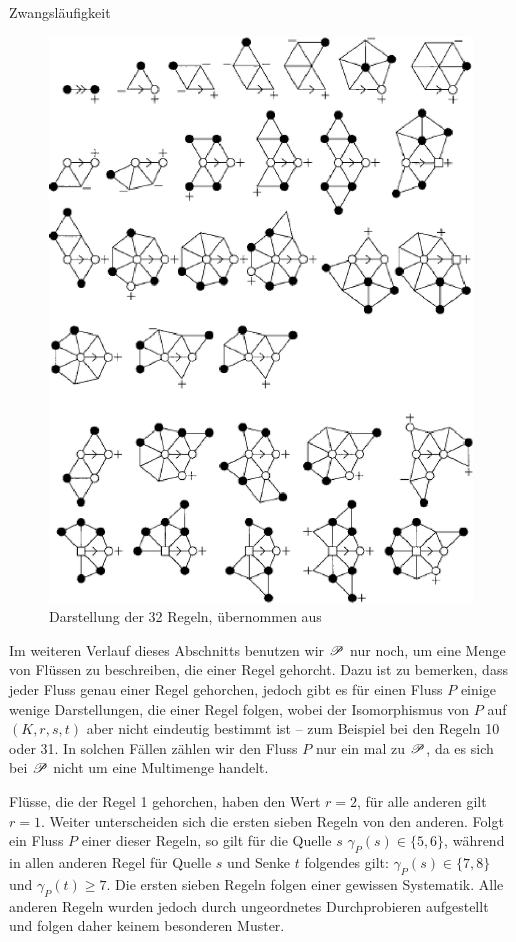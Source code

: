 \begin{section}{Zwangsläufigkeit}
 \begin{figure}[ht]
  \label{fig4}
  \centering
  \includegraphics{seymour/regeln.eps}%
  \caption[Darstellung der 32 Regeln]{Darstellung der 32 Regeln, übernommen aus \cite{FourRSST}}
 \end{figure}

 Im weiteren Verlauf dieses Abschnitts benutzen wir $\mathscr{P}$ nur noch, um eine Menge von Flüssen zu beschreiben, die einer Regel gehorcht. Dazu ist zu bemerken, dass jeder Fluss genau einer Regel gehorchen, jedoch gibt es für einen Fluss $P$ einige wenige Darstellungen, die einer Regel folgen, wobei der Isomorphismus von $P$ auf $(K,r,s,t)$ aber nicht eindeutig bestimmt ist -- zum Beispiel bei den Regeln 10 oder 31. In solchen Fällen zählen wir den Fluss $P$ nur ein mal zu $\mathscr{P}$, da es sich bei $\mathscr{P}$ nicht um eine Multimenge handelt.
 
 Flüsse, die der Regel 1 gehorchen, haben den Wert $r=2$, für alle anderen gilt $r=1$. Weiter unterscheiden sich die ersten sieben Regeln von den anderen. Folgt ein Fluss $P$ einer dieser Regeln, so gilt für die Quelle $s$ $\gamma_P(s) \in \{5,6\}$, während in allen anderen Regel für Quelle $s$ und Senke $t$ folgendes gilt: $\gamma_P(s) \in \{7,8\}$ und $\gamma_P(t) \geq 7$. Die ersten sieben Regeln folgen einer gewissen Systematik. Alle anderen Regeln wurden jedoch durch ungeordnetes Durchprobieren aufgestellt und folgen daher keinem besonderen Muster.
 

\end{section}
